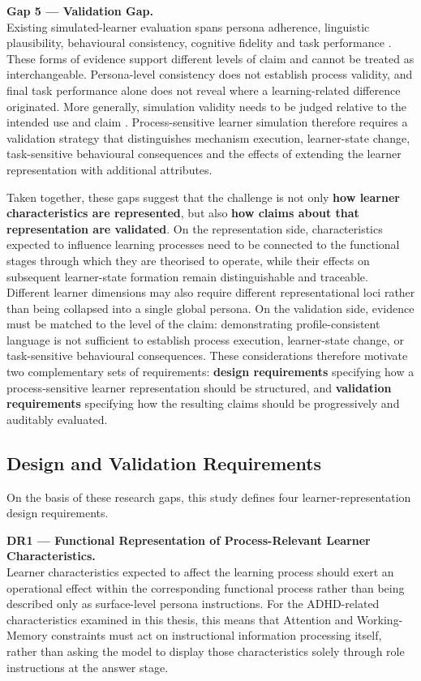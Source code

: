 \textbf{Gap 5 --- Validation Gap.}\\
Existing simulated-learner evaluation spans persona adherence, linguistic plausibility, behavioural consistency, cognitive fidelity and task performance \cite{jiang-etal-2024-personallm,scarlatos-etal-2026-simulated}. These forms of evidence support different levels of claim and cannot be treated as interchangeable. Persona-level consistency does not establish process validity, and final task performance alone does not reveal where a learning-related difference originated. More generally, simulation validity needs to be judged relative to the intended use and claim \cite{harris-etal-2020-framework}. Process-sensitive learner simulation therefore requires a validation strategy that distinguishes mechanism execution, learner-state change, task-sensitive behavioural consequences and the effects of extending the learner representation with additional attributes.

Taken together, these gaps suggest that the challenge is not only \textbf{how learner characteristics are represented}, but also \textbf{how claims about that representation are validated}. On the representation side, characteristics expected to influence learning processes need to be connected to the functional stages through which they are theorised to operate, while their effects on subsequent learner-state formation remain distinguishable and traceable. Different learner dimensions may also require different representational loci rather than being collapsed into a single global persona. On the validation side, evidence must be matched to the level of the claim: demonstrating profile-consistent language is not sufficient to establish process execution, learner-state change, or task-sensitive behavioural consequences. These considerations therefore motivate two complementary sets of requirements: \textbf{design requirements} specifying how a process-sensitive learner representation should be structured, and \textbf{validation requirements} specifying how the resulting claims should be progressively and auditably evaluated.

\subsection{Design and Validation Requirements}

On the basis of these research gaps, this study defines four learner-representation design requirements.

\textbf{DR1 --- Functional Representation of Process-Relevant Learner Characteristics.}\\
Learner characteristics expected to affect the learning process should exert an operational effect within the corresponding functional process rather than being described only as surface-level persona instructions. For the ADHD-related characteristics examined in this thesis, this means that Attention and Working-Memory constraints must act on instructional information processing itself, rather than asking the model to display those characteristics solely through role instructions at the answer stage.

